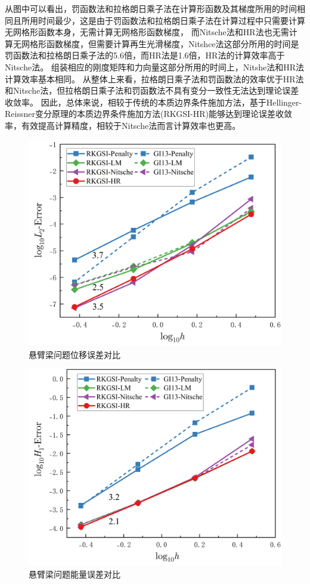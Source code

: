 从图中可以看出，罚函数法和拉格朗日乘子法在计算形函数及其梯度所用的时间相同且所用时间最少，这是由于罚函数法和拉格朗日乘子法在计算过程中只需要计算无网格形函数本身，无需计算无网格形函数梯度，
而Nitsche法和HR法也无需计算无网格形函数梯度，但需要计算再生光滑梯度，Nitshce法这部分所用的时间是罚函数法和拉格朗日乘子法的5.6倍，而HR法是1.6倍，HR法的计算效率高于Nitsche法。
组装相应的刚度矩阵和力向量这部分所用的时间上，Nitshe法和HR法计算效率基本相同。
从整体上来看，拉格朗日乘子法和罚函数法的效率优于HR法和Nitsche法，但拉格朗日乘子法和罚函数法不具有变分一致性无法达到理论误差收敛率。
因此，总体来说，相较于传统的本质边界条件施加方法，基于Hellinger-Reissner变分原理的本质边界条件施加方法(RKGSI-HR)能够达到理论误差收敛率，有效提高计算精度，相较于Nitsche法而言计算效率也更高。
\begin{figure}[H]
    \centering
    \includegraphics[scale=0.5]{figure/E/cantilever/L2.png}
    \caption{悬臂梁问题位移误差对比}\label{CL2}
\end{figure}
\begin{figure}[H]
    \centering
    \includegraphics[scale=0.5]{figure/E/cantilever/H1.png}
    \caption{悬臂梁问题能量误差对比}\label{CH1}
\end{figure}
